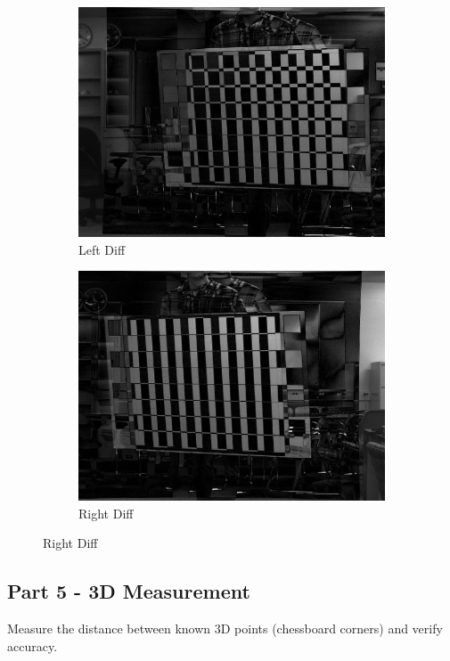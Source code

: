 \documentclass[12pt,a4paper,final]{article}
\begin{document}
\begin{figure}[H]
\centering
\begin{subfigure}{.5\textwidth}
  \centering
  \includegraphics[width=.9\linewidth]{remapDiffL}
  \caption{Left Diff}
  \label{fig:sub1}
\end{subfigure}%
\begin{subfigure}{.5\textwidth}
  \centering
  \includegraphics[width=.9\linewidth]{remapDiffR}
  \caption{Right Diff}
  \label{fig:sub2}
\end{subfigure}
\label{fig:test}
\end{figure}



\subsection*{Part 5 - 3D Measurement}
Measure the distance between known 3D points (chessboard corners) and verify accuracy.
\end{document}
